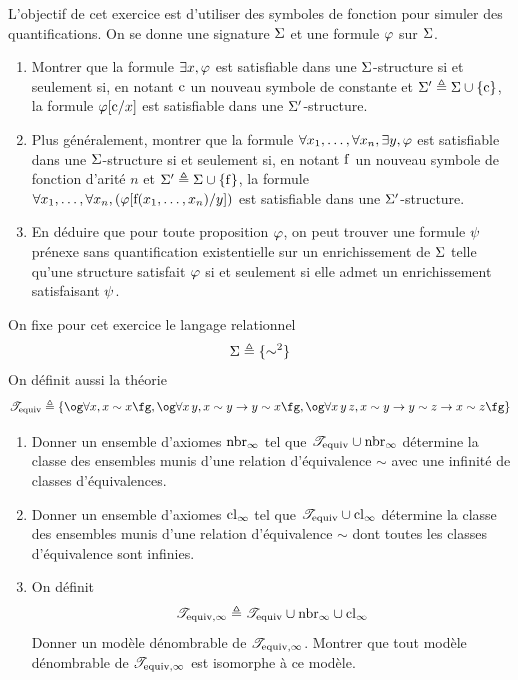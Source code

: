 \begin{exercise}[La skolémisation]\label{exo.skolemisation}
  L'objectif de cet exercice est d'utiliser des symboles de fonction pour
  simuler des quantifications.
  On se donne une signature $\Sigma$ et une formule $\varphi$ sur $\Sigma$.

  \begin{enumerate}[label=(\roman*)]
  \item Montrer que la formule $\exists x, \varphi$ est satisfiable dans une
    $\Sigma$-structure si et seulement si, en notant $\mathrm{c}$ un nouveau
    symbole de constante et $\Sigma' \triangleq \Sigma \cup \{\mathrm{c}\}$, la
    formule $\varphi[\mathrm{c}/x]$ est satisfiable dans une $\Sigma'$-structure.
  \item Plus généralement, montrer que la formule
    $\forall x_1,\ldots,\forall x_n, \exists y, \varphi$ est satisfiable dans
    une $\Sigma$-structure si et seulement si, en notant $\mathrm{f}$ un nouveau
    symbole de fonction d'arité $n$ et $\Sigma' \triangleq \Sigma\cup \{\mathrm{f}\}$, la
    formule
    $\forall x_1,\ldots,\forall x_n,(\varphi[\mathrm{f}(x_1,\ldots,x_n)/y])$ est
    satisfiable dans une $\Sigma'$-structure.
  \item En déduire que pour toute proposition $\varphi$, on peut trouver une
    formule $\psi$ prénexe sans quantification existentielle sur un
    enrichissement de $\Sigma$ telle qu'une
    structure satisfait $\varphi$ si et seulement si elle admet un
    enrichissement satisfaisant $\psi$.
  \end{enumerate}
\end{exercise}

\begin{exercise}
  On fixe pour cet exercice le langage relationnel
  \[\Sigma \triangleq \{\sim^2\}\]
  On définit aussi la théorie
  \[\varT_{\Requiv}\defeq \{\ogM\forall x, x \sim x\fgM,
  \ogM\forall x\, y, x \sim y \to y \sim x\fgM,
  \ogM\forall x\,y\,z, x \sim y \to y \sim z \to x \sim z\fgM\}\]

  \begin{enumerate}[label=(\roman*)]
  \item Donner un ensemble d'axiomes $\mathrm{nbr}_{\infty}$ tel que
    $\mathscr T_{\operatorname{equiv}}\cup \mathrm{nbr}_\infty$ détermine la classe des
    ensembles munis d'une relation d'équivalence $\sim$ avec une infinité de
    classes d'équivalences.
  \item Donner un ensemble d'axiomes $\mathrm{cl}_\infty$ tel que
    $\mathscr T_{\operatorname{equiv}}\cup \mathrm{cl}_\infty$ détermine la classe des
    ensembles munis d'une relation d'équivalence $\sim$ dont toutes les classes
    d'équivalence sont infinies.
  \item On définit
    \[\mathscr T_{\operatorname{equiv},\infty} \triangleq
    \mathscr T_{\operatorname{equiv}}\cup \mathrm{nbr}_\infty \cup \mathrm{cl}_\infty\]
    Donner un modèle dénombrable de $\mathscr T_{\operatorname{equiv},\infty}$. Montrer
    que tout modèle dénombrable de $\mathscr T_{\operatorname{equiv},\infty}$ est
    isomorphe à ce modèle.
  \end{enumerate}
\end{exercise}

